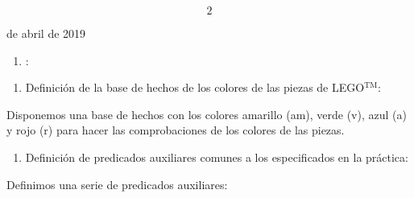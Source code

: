 \documentclass{article} %
\begin{document}


\noindent 

\noindent 

\noindent 

\noindent 
\[2\] 


\noindent \textbf{}

\noindent \textbf{\underbar{}}

\noindent {}

\noindent {}

 de abril de 2019

\noindent \eject 

\begin{enumerate}
\item  {}:\underbar{}
\end{enumerate}

\noindent 

\begin{enumerate}
\item  Definición de la base de hechos de los colores de las piezas de LEGO$\mathrm{{}^{TM}}$:
\end{enumerate}

\noindent Disponemos una base de hechos con los colores amarillo (am), verde (v), azul (a) y rojo (r) para hacer las comprobaciones de los colores de las piezas.

\noindent 

\begin{enumerate}
\item  Definición de predicados auxiliares comunes a los especificados en la práctica:
\end{enumerate}

\noindent Definimos una serie de predicados auxiliares: 

\noindent 
\end{document}

